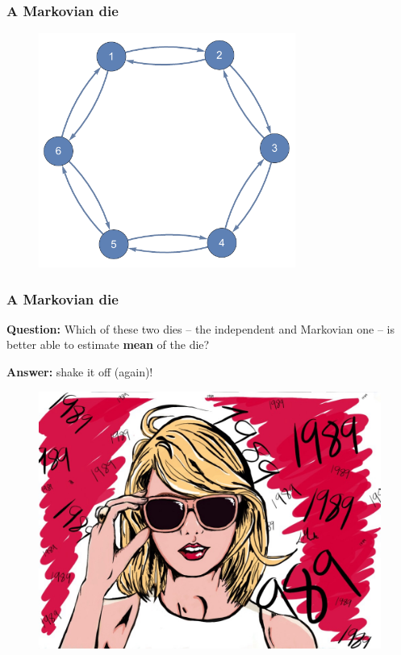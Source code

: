 \documentclass[handout]{beamer}
\begin{document}
\begin{frame}
	\frametitle{A Markovian die}

	\begin{figure}[ht]
		\centerline{\includegraphics[width=0.75\textwidth]{animations_figures/lec6_dependentDie.pdf}}
	\end{figure}
	
\end{frame}

\begin{frame}
	\frametitle{A Markovian die}
	 \textbf{Question:} Which of these two dies -- the independent and Markovian one -- is better able to estimate \textbf{mean} of the die?
	
	 \textbf{Answer:} shake it off (again)!
	
	\begin{figure}[ht]
		\centerline{\includegraphics[width=1.0\textwidth]{animations_figures/taylorSwift.jpg}}
	\end{figure}
	
\end{frame}
\end{document}
